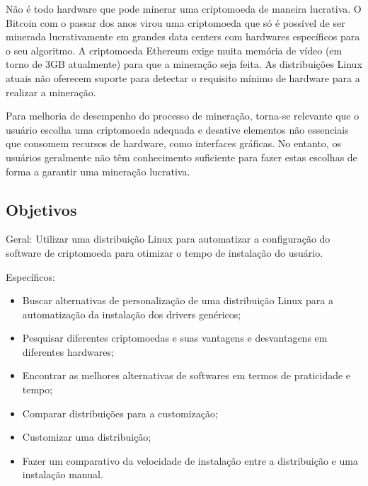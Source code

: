 \documentclass[
article,			%
12pt,				%
openright,			%
oneside,			%
a4paper,			%
chapter=TITLE,		%
section=TITLE,		%
subsection=TITLE,	%
subsubsection=TITLE,%
subsubsubsection=TITLE, %
english,			%
brazil,				%
]{abntex2}
\begin{document}
Não é todo hardware que pode minerar uma criptomoeda de maneira
lucrativa. O Bitcoin com o passar dos anos virou uma criptomoeda que
só é possível de ser minerada lucrativamente em grandes data centers
com hardwares específicos para o seu algoritmo. A criptomoeda Ethereum
exige muita memória de vídeo (em torno de 3GB atualmente) para que a
mineração seja feita. As distribuições Linux atuais não oferecem
suporte para detectar o requisito mínimo de hardware para a realizar a
mineração.

Para melhoria de desempenho do processo de mineração, torna-se
relevante que o usuário escolha uma criptomoeda adequada e desative
elementos não essenciais que consomem recursos de hardware, como
interfaces gráficas. No entanto, os usuários geralmente não têm
conhecimento suficiente para fazer estas escolhas de forma a garantir
uma mineração lucrativa. 


\subsection{Objetivos}

Geral: Utilizar uma distribuição Linux para automatizar a configuração
do software de criptomoeda para otimizar o tempo de instalação do
usuário.

Específicos: 
\begin{itemize} 

    \item Buscar alternativas de personalização de uma distribuição
        Linux para a automatização da instalação dos drivers
        genéricos;

    \item Pesquisar diferentes criptomoedas e suas vantagens e
        desvantagens em diferentes hardwares;

    \item Encontrar as melhores alternativas de softwares em termos de
        praticidade e tempo;

    \item Comparar distribuições para a customização;

    \item Customizar uma distribuição;

    \item Fazer um comparativo da velocidade de instalação entre a
distribuição e uma instalação manual.

\end{itemize}
\end{document}
